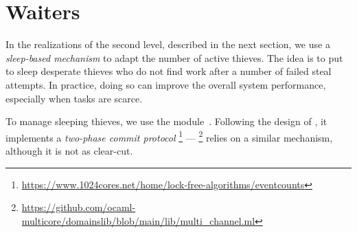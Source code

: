 \section{Waiters}
\label{sec:parabs_waiters}

In the realizations of the second level, described in the next section, we use a \emph{sleep-based mechanism} to adapt the number of active thieves.
The idea is to put to sleep desperate thieves who do not find work after a number of failed steal attempts.
In practice, doing so can improve the overall system performance, especially when tasks are scarce.

To manage sleeping thieves, we use the  module~.
Following the design of \Taskflow \citep{DBLP:journals/tpds/HuangLLL22}, it implements a \emph{two-phase commit protocol}%
\footnote{
\url{https://www.1024cores.net/home/lock-free-algorithms/eventcounts}
}
--- \Domainslib%
\footnote{
\url{https://github.com/ocaml-multicore/domainslib/blob/main/lib/multi_channel.ml}
}
relies on a similar mechanism, although it is not as clear-cut.
